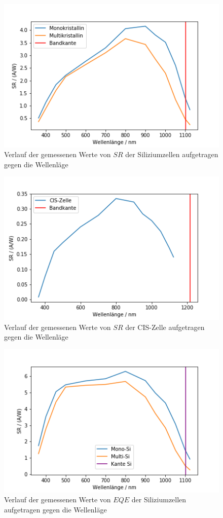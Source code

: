 \begin{figure}[h]
    \centering
    \includegraphics[scale=0.75]{Bilder/32_Si_SR.png}
    \caption{Verlauf der gemessenen Werte von $SR$ der Siliziumzellen aufgetragen gegen die Wellenläge}
    \label{bild:SiSRMess}
\end{figure}

\begin{figure}[h]
    \centering
    \includegraphics[scale=0.75]{Bilder/32_CIS_SR.png}
    \caption{Verlauf der gemessenen Werte von $SR$ der CIS-Zelle aufgetragen gegen die Wellenläge}
    \label{bild:CISSR}
\end{figure}



\begin{figure}[h]
    \centering
    \includegraphics[scale=0.75]{Bilder/32_Si_EQE.png}
    \caption{Verlauf der gemessenen Werte von $EQE$ der Siliziumzellen aufgetragen gegen die Wellenläge}
    \label{bild:SiEQE}
\end{figure}


